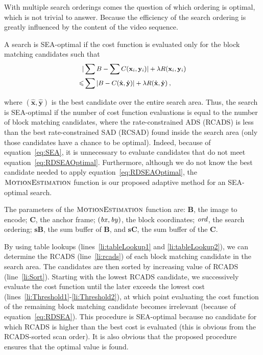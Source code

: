 \documentclass{article}
\newcommand{\beq}{\begin{dmath}}
\newcommand{\eeq}{\end{dmath}}
\newcommand{\vx}{\mathbf{x}}
\newcommand{\vy}{\mathbf{y}}
\begin{document}
With multiple search orderings comes the question of which ordering is optimal, which is not trivial to answer. Because the efficiency of the search ordering is greatly influenced by the content of the video sequence.

A search is SEA-optimal if the cost function is evaluated only for the block matching candidates such that
\beq
\small
\begin{aligned}
| & \sum{B} - \sum{C(\vx_i,\vy_i)} | + \lambda R(\vx_i,\vy_i) \\ \leqslant
& \sum{|B - C(\hat{\vx},\hat{\vy})|} + \lambda R(\hat{\vx},\hat{\vy}) \:,
\end{aligned}
\label{eq:RDSEAOptimal}
\eeq 

where $(\hat{\vx},\hat{\vy})$ is the best candidate over the entire search area. Thus, the search is SEA-optimal if the number of cost function evaluations is equal to the number of block matching candidates, where the rate-constrained ADS (RCADS) is less than the best rate-constrained SAD (RCSAD) found inside the search area (only those candidates have a chance to be optimal). Indeed, because of equation~\ref{eq:SEA}, it is unnecessary to evaluate candidates that do not meet equation~\ref{eq:RDSEAOptimal}. Furthermore, although we do not know the best candidate needed to apply equation~\ref{eq:RDSEAOptimal}, the $\textnormal{\scshape MotionEstimation}$ function is our proposed adaptive method for an SEA-optimal search.

The parameters of the $\textnormal{\scshape MotionEstimation}$ function are: $\textbf{B}$, the image to encode; $\textbf{C}$, the anchor frame; $(\id{bx},\id{by})$, the block coordinates; $\id{ord}$, the search ordering; $\textbf{sB}$, the sum buffer of $\textbf{B}$, and $\textbf{sC}$, the sum buffer of the $\textbf{C}$. 

By using table lookups (lines~\ref{li:tableLookup1} and \ref{li:tableLookup2}), we can determine the RCADS (line~\ref{li:rcads}) of each block matching candidate in the search area. The candidates are then sorted by increasing value of RCADS (line~\ref{li:Sort}). Starting with the lowest RCADS candidate, we successively evaluate the cost function until the later exceeds the lowest cost (lines~\ref{li:Threshold1}-\ref{li:Threshold2}), at which point evaluating the cost function of the remaining block matching candidate becomes irrelevant (because of equation~\ref{eq:RDSEA}). This procedure is SEA-optimal because no candidate for which RCADS is higher than the best cost is evaluated (this is obvious from the RCADS-sorted scan order). It is also obvious that the proposed procedure ensures that the optimal value is found.
\end{document}
